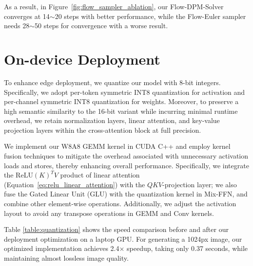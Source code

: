 As a result, in Figure~\ref{fig:flow_sampler_ablation}, our Flow-DPM-Solver converges at 14$\sim$20 steps with better performance, while the Flow-Euler sampler needs 28$\sim$50 steps for convergence with a worse result.


\section{On-device Deployment} \label{sec:deploy}

To enhance edge deployment, we quantize our model with 8-bit integers. Specifically, we adopt per-token symmetric INT8 quantization for activation and per-channel symmetric INT8 quantization for weights. Moreover, to preserve a high semantic similarity to the 16-bit variant while incurring minimal runtime overhead, we retain normalization layers, linear attention, and key-value projection layers within the cross-attention block at full precision.



We implement our W8A8 GEMM kernel in CUDA C++ and employ kernel fusion techniques to mitigate the overhead associated with unnecessary activation loads and stores, thereby enhancing overall performance. Specifically, we integrate the $\text{ReLU}(K)^TV$ product of linear attention (Equation~\ref{eq:relu_linear_attention}) with the $QKV$-projection layer; we also fuse the Gated Linear Unit (GLU) with the quantization kernel in Mix-FFN, and combine other element-wise operations. Additionally, we adjust the activation layout to avoid any transpose operations in GEMM and Conv kernels.

Table \ref{table:quantization} shows the speed comparison before and after our deployment optimization on a laptop GPU. For generating a 1024px image, our optimized implementation achieves 2.4$\times$ speedup, taking only 0.37 seconds, while maintaining almost lossless image quality.
